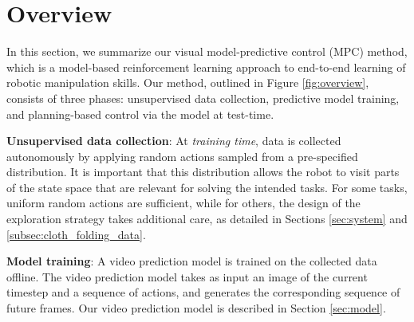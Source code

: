 \section{Overview}\label{sec:prelim}
\label{sec:vmpc}

In this section, we summarize our visual model-predictive control (MPC) method, which is a model-based reinforcement learning approach to end-to-end learning of robotic manipulation skills. Our method, outlined in Figure \ref{fig:overview}, consists of three phases: unsupervised data collection, predictive model training, and planning-based control via the model at test-time.

\noindent \textbf{Unsupervised data collection}: At \emph{training time}, data is collected autonomously by applying random actions sampled from a pre-specified distribution. It is important that this distribution allows the robot to visit parts of the state space that are relevant for solving the intended tasks. For some tasks, uniform random actions are sufficient, while for others, the design of the exploration strategy takes additional care, as detailed in Sections \ref{sec:system} and \ref{subsec:cloth_folding_data}.

\noindent \textbf{Model training}: A video prediction model is trained on the collected data offline. The video prediction model takes as input an image of the current timestep and a sequence of actions, and generates the corresponding sequence of future frames. Our video prediction model is described in Section \ref{sec:model}.

